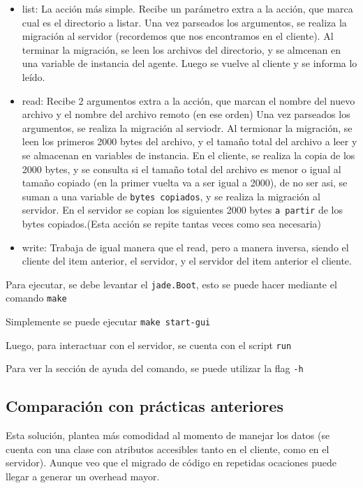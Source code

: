 \documentclass[osajnl,twocolumn,showpacs,superscriptaddress,10pt]{revtex4-1} %
\begin{document}
\begin{itemize}
      \item list: La acción más simple. Recibe un parámetro extra a la acción,
            que marca cual es el directorio a listar.
            Una vez parseados los argumentos, se realiza la migración al servidor
            (recordemos que nos encontramos en el cliente).
            Al terminar la migración, se leen los archivos del directorio, y se
            almcenan en una variable de instancia del agente. Luego se vuelve al
            cliente y se informa lo leído.\\

      \item read: Recibe 2 argumentos extra a la acción, que marcan el nombre del
            nuevo archivo y el nombre del archivo remoto (en ese orden)
            Una vez parseados los argumentos, se realiza la migración al serviodr.
            Al termionar la migración, se leen los primeros 2000 bytes del archivo,
            y el tamaño total del archivo a leer y se almacenan en variables de instancia.
            En el cliente, se realiza la copia de los 2000 bytes, y se consulta si el
            tamaño total del archivo es menor o igual al tamaño copiado (en la primer
            vuelta va a ser igual a 2000), de no ser asi, se suman a una variable de
            \texttt{bytes copiados}, y se realiza la migración al servidor.
            En el servidor se copian los siguientes 2000 bytes \texttt{a partir}
            de los bytes copiados.(Esta acción se repite tantas veces como 
            sea necesaria)\\
      
      \item write: Trabaja de igual manera que el read, pero a manera inversa,
            siendo el cliente del item anterior, el servidor, y el servidor del item
            anterior el cliente.\\
\end{itemize}

Para ejecutar, se debe levantar el \texttt{jade.Boot}, esto se puede hacer
mediante el comando \texttt{make}

Simplemente se puede ejecutar \texttt{make start-gui}

Luego, para interactuar con el servidor, se cuenta con el script \texttt{run}

Para ver la sección de ayuda del comando, se puede utilizar la flag \texttt{-h}

\subsection{Comparación con prácticas anteriores}

Esta solución, plantea más comodidad al momento de manejar los datos
(se cuenta con una clase con atributos accesibles tanto en el cliente,
como en el servidor). Aunque veo que el migrado de código en repetidas
ocaciones puede llegar a generar un overhead mayor.
\end{document}
